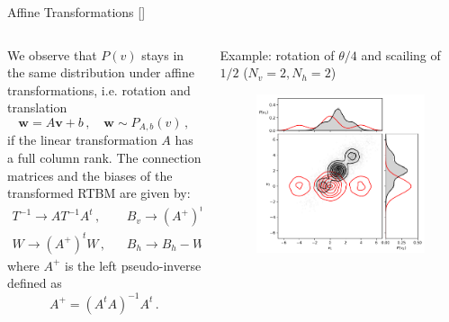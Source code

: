 \documentclass[10pt]{beamer}
\begin{document}
\begin{frame}{Affine Transformations \hfill \small [\cite{Carrazza:2018nmd}]}
    \begin{columns}
        \begin{column}{0.5 \textwidth}
            We observe that $P(v)$ stays in the same distribution under affine
            transformations, i.e. rotation and translation
            $$
            \mathbf w = A \mathbf v+b\,, \quad \mathbf w \sim P_{A,b}(v)\,,
            $$
            if the linear transformation $A$ has a full column rank.
            The connection matrices and the biases of the transformed RTBM are given by:
            \begin{equation*}
            \begin{split}
            T^{-1}\rightarrow AT^{-1}A^t\,,&\,\,\,\,\, B_v \rightarrow (A^+)^t B_v-Tb\,,\\
            W\rightarrow (A^+)^t W\,,&\,\,\,\,\, B_h\rightarrow B_h - W^tb \,.
            \end{split}
            \end{equation*}
            where $A^+$ is the left pseudo-inverse defined as
            \begin{equation*}\label{leftinverse}
            A^+ = (A^t A)^{-1}A^t\,.
            \end{equation*}
        \end{column}
        \begin{column}{0.5 \textwidth}
            \centering
            Example: rotation of $\theta / 4$ and scailing of $1/2$ ($N_v = 2, N_h =2 $)
    \begin{figure}
        \begin{center}
          \includegraphics[scale=0.4]{figures/rotation2d.pdf}

\end{center}
\end{figure}
\end{column}
\end{columns}
\end{frame}
\end{document}
